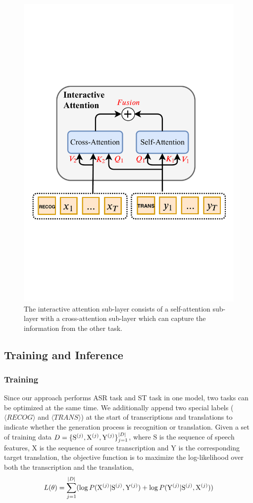 \documentclass[letterpaper]{article} %
\begin{document}
\begin{figure}[t]
\centering
\includegraphics[width=0.9\columnwidth]{Interactivate_attention.pdf}
\caption{The interactive attention sub-layer consists of a self-attention sub-layer with a cross-attention sub-layer which can capture the information from the other task.}
\label{fig:interactivate_learning}
\end{figure}

\subsection{Training and Inference}
\subsubsection{Training}
Since our approach performs ASR task and ST task in one model, two tasks can be optimized at the same time. We additionally append two special labels ($\langle  RECOG\rangle$ and $\langle TRANS\rangle$) at the start of transcriptions and translations to indicate whether the generation process is recognition or translation.  Given a set of training data $\small{D=\{\mathrm{S}^{(j)},\mathrm{X}^{(j)},\mathrm{Y}^{(j)}\}_{j=1}^{|D|}}$, where $\mathrm{S}$ is the sequence of speech features, $\mathrm{X}$ is the sequence of source transcription and $\mathrm{Y}$ is the corresponding target translation, the objective function is to maximize the log-likelihood over both the transcription and the translation,
\begin{equation}
\small
L(\theta)=\sum_{j=1}^{|D|} (\log P(\mathrm{X}^{(j)}|\mathrm{S}^{(j)},\mathrm{Y}^{(j)}) + \log P(\mathrm{Y}^{(j)}|\mathrm{S}^{(j)},\mathrm{X}^{(j)}))
\end{equation}
\end{document}

